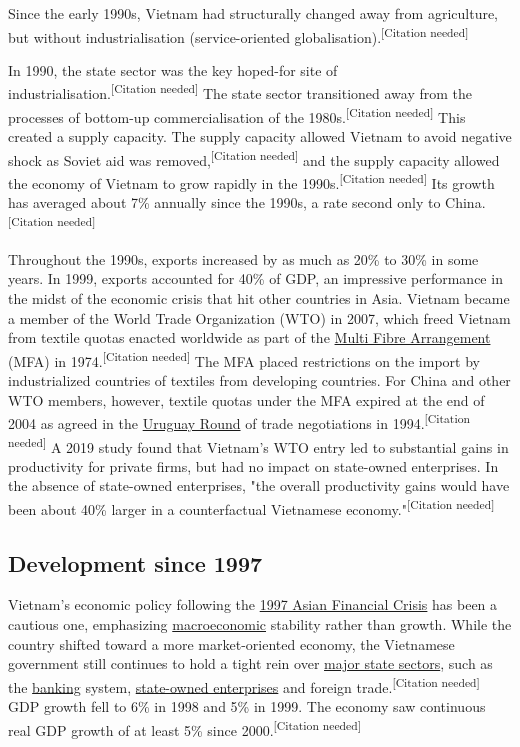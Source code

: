\documentclass{article}
\begin{document}
Since the early 1990s, Vietnam had structurally changed away from agriculture, but without industrialisation (service-oriented globalisation).\textsuperscript{[Citation needed]}

In 1990, the state sector was the key hoped-for site of \\industrialisation.\textsuperscript{[Citation needed]} The state sector transitioned away from the processes of bottom-up commercialisation of the 1980s.\textsuperscript{[Citation needed]} This created a supply capacity. The supply capacity allowed Vietnam to avoid negative shock as Soviet aid was removed,\textsuperscript{[Citation needed]} and the supply capacity allowed the economy of Vietnam to grow rapidly in the 1990s.\textsuperscript{[Citation needed]} Its growth has averaged about 7\% annually since the 1990s, a rate second only to China.\textsuperscript{[Citation needed]}

Throughout the 1990s, exports increased by as much as 20\% to 30\% in some years. In 1999, exports accounted for 40\% of GDP, an impressive performance in the midst of the economic crisis that hit other countries in Asia. Vietnam became a member of the World Trade Organization (WTO) in 2007, which freed Vietnam from textile quotas enacted worldwide as part of the \href{https://en.wikipedia.org/wiki/Multi_Fibre_Arrangement}{Multi Fibre Arrangement} (MFA) in 1974.\textsuperscript{[Citation needed]} The MFA placed restrictions on the import by industrialized countries of textiles from developing countries. For China and other WTO members, however, textile quotas under the MFA expired at the end of 2004 as agreed in the \href{https://en.wikipedia.org/wiki/Uruguay_Round}{Uruguay Round} of trade negotiations in 1994.\textsuperscript{[Citation needed]} A 2019 study found that Vietnam's WTO entry led to substantial gains in productivity for private firms, but had no impact on state-owned enterprises. In the absence of state-owned enterprises, "the overall productivity gains would have been about 40\% larger in a counterfactual Vietnamese economy."\textsuperscript{[Citation needed]}

\subsection*{Development since 1997}
Vietnam's economic policy following the \href{https://en.wikipedia.org/wiki/1997_Asian_Financial_Crisis}{1997 Asian Financial Crisis} has been a cautious one, emphasizing \href{https://en.wikipedia.org/wiki/Macroeconomic}{macroeconomic} stability rather than growth. While the country shifted toward a more market-oriented economy, the Vietnamese government still continues to hold a tight rein over \href{https://en.wikipedia.org/wiki/Public_sector}{major state sectors}, such as the \href{https://en.wikipedia.org/wiki/Bank}{banking} system, \href{https://en.wikipedia.org/wiki/State-owned_enterprises}{state-owned enterprises} and foreign trade.\textsuperscript{[Citation needed]} GDP growth fell to 6\% in 1998 and 5\% in 1999. The economy saw continuous real GDP growth of at least 5\% since 2000.\textsuperscript{[Citation needed]}
\end{document}
